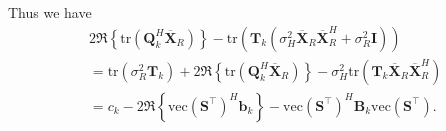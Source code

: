 Thus we have
\begin{equation}
\begin{aligned}
    &2\Re\left\{\text{tr}(\mathbf{Q}_k^H\overline{\mathbf{X}}_R)\right\} - \text{tr}(\mathbf{T}_k(\sigma_H^2\overline{\mathbf{X}}_R\overline{\mathbf{X}}_R^H+\sigma_R^2\mathbf{I})) \\
    &= \text{tr}(\sigma_R^2\mathbf{T}_k) + 2\Re\left\{\text{tr}(\mathbf{Q}_k^H\overline{\mathbf{X}}_R)\right\} - \sigma_H^2\text{tr}(\mathbf{T}_k\overline{\mathbf{X}}_R\overline{\mathbf{X}}_R^H) \\
    &= c_k - 2\Re\left\{\text{vec}(\mathbf{S}^{\top})^H\mathbf{b}_k\right\}-\text{vec}(\mathbf{S}^{\top})^H\mathbf{B}_k\text{vec}(\mathbf{S}^{\top}).
\end{aligned}
\end{equation}

